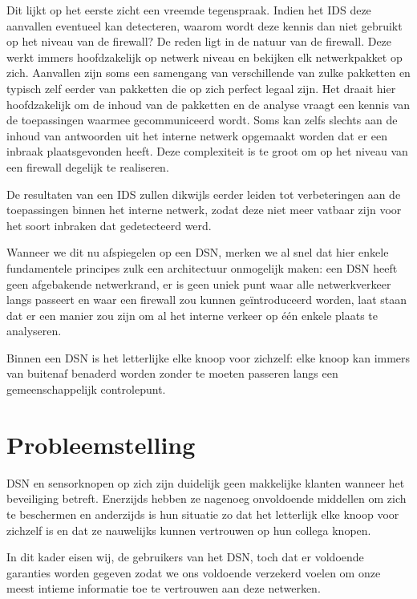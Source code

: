 Dit lijkt op het eerste zicht een vreemde tegenspraak. Indien het IDS deze
aanvallen eventueel kan detecteren, waarom wordt deze kennis dan niet gebruikt
op het niveau van de firewall? De reden ligt in de natuur van de firewall. Deze
werkt immers hoofdzakelijk op netwerk niveau en bekijken elk netwerkpakket op
zich. Aanvallen zijn soms een samengang van verschillende van zulke pakketten
en typisch zelf eerder van pakketten die op zich perfect legaal zijn. Het
draait hier hoofdzakelijk om de inhoud van de pakketten en de analyse vraagt
een kennis van de toepassingen waarmee gecommuniceerd wordt. Soms kan zelfs
slechts aan de inhoud van antwoorden uit het interne netwerk opgemaakt worden
dat er een inbraak plaatsgevonden heeft. Deze complexiteit is te groot om op
het niveau van een firewall degelijk te realiseren.

De resultaten van een IDS zullen dikwijls eerder leiden tot verbeteringen aan
de toepassingen binnen het interne netwerk, zodat deze niet meer vatbaar zijn
voor het soort inbraken dat gedetecteerd werd.

Wanneer we dit nu afspiegelen op een DSN, merken we al snel dat hier enkele
fundamentele principes zulk een architectuur onmogelijk maken: een DSN heeft
geen afgebakende netwerkrand, er is geen uniek punt waar alle netwerkverkeer
langs passeert en waar een firewall zou kunnen ge\"introduceerd worden, laat
staan dat er een manier zou zijn om al het interne verkeer op \'e\'en enkele
plaats te analyseren.

Binnen een DSN is het letterlijke elke knoop voor zichzelf: elke knoop kan
immers van buitenaf benaderd worden zonder te moeten passeren langs een
gemeenschappelijk controlepunt.

\section{Probleemstelling}
\label{section:probleem}

DSN en sensorknopen op zich zijn duidelijk geen makkelijke klanten wanneer het
beveiliging betreft. Enerzijds hebben ze nagenoeg onvoldoende middellen om zich
te beschermen en anderzijds is hun situatie zo dat het letterlijk elke knoop
voor zichzelf is en dat ze nauwelijks kunnen vertrouwen op hun collega knopen.

In dit kader eisen wij, de gebruikers van het DSN, toch dat er voldoende
garanties worden gegeven zodat we ons voldoende verzekerd voelen om onze meest
intieme informatie toe te vertrouwen aan deze netwerken.


